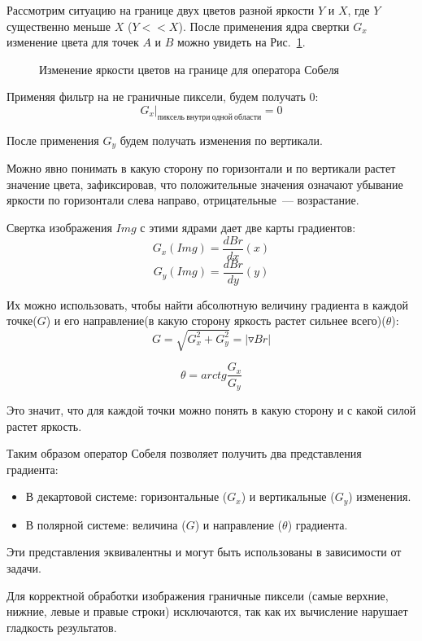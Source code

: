 Рассмотрим ситуацию на границе двух цветов разной яркости $Y$ и $X$, где $Y$ существенно меньше $X$ ($Y<<X$). После применения ядра свертки $G_x$ изменение цвета для точек $A$ и $B$ можно увидеть на Рис.~\ref{fig:sobel_on_border}.

\begin{figure}[h]
    \centering
    
    \caption{Изменение яркости цветов на границе для оператора Собеля}
    \label{fig:sobel_on_border}
\end{figure}

Применяя фильтр на не граничные пиксели, будем получать 0:
\[
    G_x|_{пиксель \ внутри \  одной \ области}= 0
\]

После применения $G_y$ будем получать изменения по вертикали.

Можно явно понимать в какую сторону по горизонтали и по вертикали растет значение цвета, зафиксировав, что положительные значения означают убывание яркости по горизонтали слева направо, отрицательные~--- возрастание.

Свертка изображения $Img$ с этими ядрами дает две карты градиентов:
\[
    G_x(Img) = \frac{d Br}{dx} (x)
\]
\[
    G_y(Img) = \frac{d Br}{dy} (y)
\]

Их можно использовать, чтобы найти абсолютную величину градиента в каждой точке($G$) и его направление(в какую сторону яркость растет сильнее всего)($\theta$):
\[
    G = \sqrt{G_x^2 + G_y^2} = |\triangledown Br|
\]

\[
    \theta = arctg \frac{G_x}{G_y}
\]

Это значит, что для каждой точки можно понять в какую сторону и с какой силой растет яркость.

Таким образом оператор Собеля позволяет получить два представления градиента:
\begin{itemize}
    \item В декартовой системе: горизонтальные (\(G_x\)) и вертикальные (\(G_y\)) изменения.
    \item В полярной системе: величина (\(G\)) и направление (\(\theta\)) градиента.
\end{itemize}

Эти представления эквивалентны и могут быть использованы в зависимости от задачи.

Для корректной обработки изображения граничные пиксели (самые верхние, нижние, левые и правые строки) исключаются, так как их вычисление нарушает гладкость результатов.


